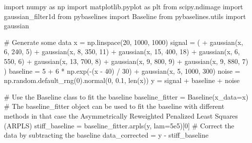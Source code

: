 \documentclass[
  letterpaper,
  DIV=11,
  numbers=noendperiod]{scrreprt}
\newenvironment{Shaded}{\begin{snugshade}}{\end{snugshade}}
\newcommand{\BuiltInTok}[1]{\textcolor[rgb]{0.00,0.23,0.31}{#1}}
\newcommand{\CommentTok}[1]{\textcolor[rgb]{0.37,0.37,0.37}{#1}}
\newcommand{\DecValTok}[1]{\textcolor[rgb]{0.68,0.00,0.00}{#1}}
\newcommand{\FloatTok}[1]{\textcolor[rgb]{0.68,0.00,0.00}{#1}}
\newcommand{\ImportTok}[1]{\textcolor[rgb]{0.00,0.46,0.62}{#1}}
\newcommand{\NormalTok}[1]{\textcolor[rgb]{0.00,0.23,0.31}{#1}}
\newcommand{\OperatorTok}[1]{\textcolor[rgb]{0.37,0.37,0.37}{#1}}
\begin{document}
\begin{Shaded}
\begin{Highlighting}[]
\ImportTok{import}\NormalTok{ numpy }\ImportTok{as}\NormalTok{ np}
\ImportTok{import}\NormalTok{ matplotlib.pyplot }\ImportTok{as}\NormalTok{ plt}
\ImportTok{from}\NormalTok{ scipy.ndimage }\ImportTok{import}\NormalTok{ gaussian\_filter1d}
\ImportTok{from}\NormalTok{ pybaselines }\ImportTok{import}\NormalTok{ Baseline}
\ImportTok{from}\NormalTok{ pybaselines.utils }\ImportTok{import}\NormalTok{ gaussian}


\CommentTok{\# Generate some data}
\NormalTok{x }\OperatorTok{=}\NormalTok{ np.linspace(}\DecValTok{20}\NormalTok{, }\DecValTok{1000}\NormalTok{, }\DecValTok{1000}\NormalTok{)}
\NormalTok{signal }\OperatorTok{=}\NormalTok{ (}
    \OperatorTok{+}\NormalTok{ gaussian(x, }\DecValTok{6}\NormalTok{, }\DecValTok{240}\NormalTok{, }\DecValTok{5}\NormalTok{)}
    \OperatorTok{+}\NormalTok{ gaussian(x, }\DecValTok{8}\NormalTok{, }\DecValTok{350}\NormalTok{, }\DecValTok{11}\NormalTok{)}
    \OperatorTok{+}\NormalTok{ gaussian(x, }\DecValTok{15}\NormalTok{, }\DecValTok{400}\NormalTok{, }\DecValTok{18}\NormalTok{)}
    \OperatorTok{+}\NormalTok{ gaussian(x, }\DecValTok{6}\NormalTok{, }\DecValTok{550}\NormalTok{, }\DecValTok{6}\NormalTok{)}
    \OperatorTok{+}\NormalTok{ gaussian(x, }\DecValTok{13}\NormalTok{, }\DecValTok{700}\NormalTok{, }\DecValTok{8}\NormalTok{)}
    \OperatorTok{+}\NormalTok{ gaussian(x, }\DecValTok{9}\NormalTok{, }\DecValTok{800}\NormalTok{, }\DecValTok{9}\NormalTok{)}
    \OperatorTok{+}\NormalTok{ gaussian(x, }\DecValTok{9}\NormalTok{, }\DecValTok{880}\NormalTok{, }\DecValTok{7}\NormalTok{)}
\NormalTok{)}
\NormalTok{baseline }\OperatorTok{=} \DecValTok{5} \OperatorTok{+} \DecValTok{6} \OperatorTok{*}\NormalTok{ np.exp(}\OperatorTok{{-}}\NormalTok{(x }\OperatorTok{{-}} \DecValTok{40}\NormalTok{) }\OperatorTok{/} \DecValTok{30}\NormalTok{) }\OperatorTok{+}\NormalTok{ gaussian(x, }\DecValTok{5}\NormalTok{, }\DecValTok{1000}\NormalTok{, }\DecValTok{300}\NormalTok{)}
\NormalTok{noise }\OperatorTok{=}\NormalTok{ np.random.default\_rng(}\DecValTok{0}\NormalTok{).normal(}\DecValTok{0}\NormalTok{, }\FloatTok{0.1}\NormalTok{, }\BuiltInTok{len}\NormalTok{(x))}
\NormalTok{y }\OperatorTok{=}\NormalTok{ signal }\OperatorTok{+}\NormalTok{ baseline }\OperatorTok{+}\NormalTok{ noise}

\CommentTok{\# Use the Baseline class to fit the baseline}
\NormalTok{baseline\_fitter }\OperatorTok{=}\NormalTok{ Baseline(x\_data}\OperatorTok{=}\NormalTok{x)}
\CommentTok{\# The baseline\_fitter object can be used to fit the baseline with different methods in that case the Asymmetrically Reweighted Penalized Least Squares (ARPLS)}
\NormalTok{stiff\_baseline }\OperatorTok{=}\NormalTok{ baseline\_fitter.arpls(y, lam}\OperatorTok{=}\FloatTok{5e5}\NormalTok{)[}\DecValTok{0}\NormalTok{]}
\CommentTok{\# Correct the data by subtracting the baseline}
\NormalTok{data\_corrected }\OperatorTok{=}\NormalTok{ y }\OperatorTok{{-}}\NormalTok{ stiff\_baseline}


\end{Highlighting}
\end{Shaded}
\end{document}
